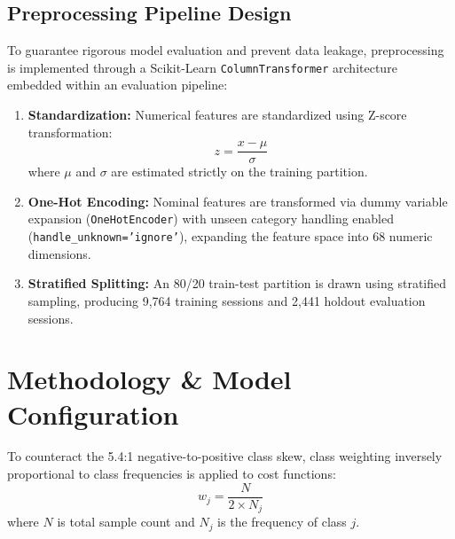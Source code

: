 \documentclass[11pt,a4paper]{article}
\begin{document}
\subsection{Preprocessing Pipeline Design}
To guarantee rigorous model evaluation and prevent data leakage, preprocessing is implemented through a Scikit-Learn \texttt{ColumnTransformer} architecture embedded within an evaluation pipeline:
\begin{enumerate}
    \item \textbf{Standardization:} Numerical features are standardized using Z-score transformation:
    \begin{equation}
        z = \frac{x - \mu}{\sigma}
    \end{equation}
    where $\mu$ and $\sigma$ are estimated strictly on the training partition.
    \item \textbf{One-Hot Encoding:} Nominal features are transformed via dummy variable expansion (\texttt{OneHotEncoder}) with unseen category handling enabled (\texttt{handle\_unknown='ignore'}), expanding the feature space into 68 numeric dimensions.
    \item \textbf{Stratified Splitting:} An 80/20 train-test partition is drawn using stratified sampling, producing 9,764 training sessions and 2,441 holdout evaluation sessions.
\end{enumerate}

\section{Methodology \& Model Configuration}

To counteract the 5.4:1 negative-to-positive class skew, class weighting inversely proportional to class frequencies is applied to cost functions:
\begin{equation}
    w_j = \frac{N}{2 \times N_j}
\end{equation}
where $N$ is total sample count and $N_j$ is the frequency of class $j$.
\end{document}
